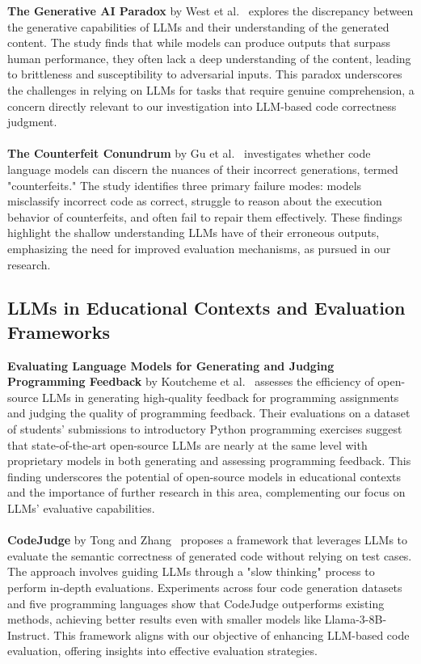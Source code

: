 \documentclass[a4paper]{usiinfbachelorproject}
\begin{document}
\textbf{The Generative AI Paradox} by West et al.~\cite{west2023generative} explores the discrepancy between the generative capabilities of LLMs and their understanding of the generated content. The study finds that while models can produce outputs that surpass human performance, they often lack a deep understanding of the content, leading to brittleness and susceptibility to adversarial inputs. This paradox underscores the challenges in relying on LLMs for tasks that require genuine comprehension, a concern directly relevant to our investigation into LLM-based code correctness judgment.\\
\\[2pt]
\textbf{The Counterfeit Conundrum} by Gu et al.~\cite{gu2024counterfeit} investigates whether code language models can discern the nuances of their incorrect generations, termed "counterfeits." The study identifies three primary failure modes: models misclassify incorrect code as correct, struggle to reason about the execution behavior of counterfeits, and often fail to repair them effectively. These findings highlight the shallow understanding LLMs have of their erroneous outputs, emphasizing the need for improved evaluation mechanisms, as pursued in our research.

\subsection{LLMs in Educational Contexts and Evaluation Frameworks}

\textbf{Evaluating Language Models for Generating and Judging Programming Feedback} by Koutcheme et al.~\cite{koutcheme2025evaluating} assesses the efficiency of open-source LLMs in generating high-quality feedback for programming assignments and judging the quality of programming feedback. Their evaluations on a dataset of students' submissions to introductory Python programming exercises suggest that state-of-the-art open-source LLMs are nearly at the same level with proprietary models in both generating and assessing programming feedback. This finding underscores the potential of open-source models in educational contexts and the importance of further research in this area, complementing our focus on LLMs' evaluative capabilities.\\
\\[2pt]
\textbf{CodeJudge} by Tong and Zhang~\cite{tong2024codejudge} proposes a framework that leverages LLMs to evaluate the semantic correctness of generated code without relying on test cases. The approach involves guiding LLMs through a "slow thinking" process to perform in-depth evaluations. Experiments across four code generation datasets and five programming languages show that CodeJudge outperforms existing methods, achieving better results even with smaller models like Llama-3-8B-Instruct. This framework aligns with our objective of enhancing LLM-based code evaluation, offering insights into effective evaluation strategies.
\end{document}
